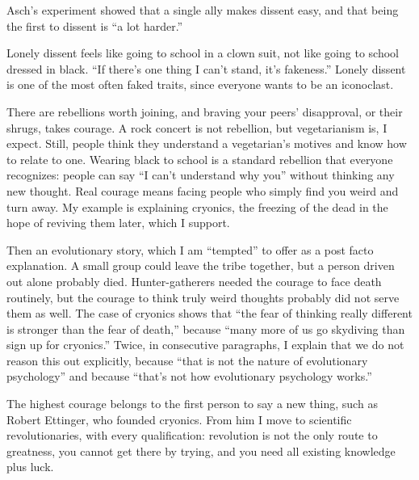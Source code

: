 
Asch's experiment showed that a single ally makes dissent easy, and that being the first to dissent is ``a lot harder.'' 

Lonely dissent feels like going to school in a clown suit, not like going to school dressed in black. ``If there's one thing I can't stand, it's fakeness.'' Lonely dissent is one of the most often faked traits, since everyone wants to be an iconoclast.

There are rebellions worth joining, and braving your peers' disapproval, or their shrugs, takes courage. A rock concert is not rebellion, but vegetarianism is, I expect. Still, people think they understand a vegetarian's motives and know how to relate to one. Wearing black to school is a standard rebellion that everyone recognizes: people can say ``I can't understand why you'' without thinking any new thought. Real courage means facing people who simply find you weird and turn away. My example is explaining cryonics, the freezing of the dead in the hope of reviving them later, which I support. 

Then an evolutionary story, which I am ``tempted'' to offer as a post facto explanation. A small group could leave the tribe together, but a person driven out alone probably died. Hunter-gatherers needed the courage to face death routinely, but the courage to think truly weird thoughts probably did not serve them as well. The case of cryonics shows that ``the fear of thinking really different is stronger than the fear of death,'' because ``many more of us go skydiving than sign up for cryonics.''  Twice, in consecutive paragraphs, I explain that we do not reason this out explicitly, because ``that is not the nature of evolutionary psychology'' and because ``that's not how evolutionary psychology works.''

The highest courage belongs to the first person to say a new thing, such as Robert Ettinger, who founded cryonics. From him I move to scientific revolutionaries, with every qualification: revolution is not the only route to greatness, you cannot get there by trying, and you need all existing knowledge plus luck. 

